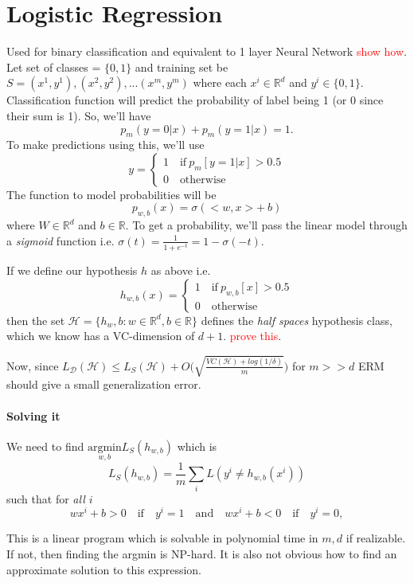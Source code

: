 \section{Logistic Regression}
Used for binary classification and equivalent to 1 layer Neural Network \textcolor{red}{show how}. Let set of classes = $\{0,1\}$ and training set be $S = {(x^1, y^1), (x^2, y^2), ... (x^m, y^m)}$ where each $x^i \in \mathbb{R}^d$ and $y^i \in \{0,1\}$. Classification function will predict the probability of label being 1 (or 0 since their sum is 1). So, we'll have
\[
	p_m(y=0|x) + p_m(y=1|x) = 1.
\]
To make predictions using this, we'll use
\[
y = 
\begin{cases} 
\text{1} \quad \text{if} ~p_m[y=1 | x] > 0.5\\
\text{0} \quad \text{otherwise}
\end{cases}
\]
The function to model probabilities will be 
\[
	p_{w,b}(x) = \sigma(<w,x> +~ b)
\]
where $W \in \mathbb{R}^d$ and $b \in \mathbb{R}$. To get a probability, we'll pass the linear model through a \textit{sigmoid} function i.e. $\sigma(t) = \frac{1}{1 + e^{-t}} = 1-\sigma(-t)$.

If we define our hypothesis $h$ as above i.e. 
\[
h_{w,b}(x) = 
\begin{cases} 
\text{1} \quad \text{if} ~p_{w,b}[x] > 0.5\\
\text{0} \quad \text{otherwise}
\end{cases}
\]
then the set $\mathcal{H} = \{h_w,b: w\in\mathbb{R}^d, b\in\mathbb{R}\}$ defines the \textit{half spaces} hypothesis class, which we know has a VC-dimension of $d+1$. \textcolor{red}{prove this}.

Now, since $L_\mathcal{D}(\mathcal{H}) \leq L_S(\mathcal{H}) + O\big(\sqrt{\frac{VC(\mathcal{H}) + log(1/\delta)}{m}}\big)$ for $m>>d$ ERM should give a small generalization error.

\paragraph{Solving it} We need to find $\underset{w,b}{\text{argmin}}L_S(h_{w,b})$ which is
\[
	L_S(h_{w,b}) = \frac{1}{m}\sum_{i}L(y^i \neq h_{w,b}(x^i))
\] 
such that for \textit{all $i$}
\[
	wx^i + b > 0 \quad \text{if} \quad y^i = 1 \quad \text{and} \quad
	wx^i + b < 0 \quad \text{if} \quad y^i = 0,	
\]

This is a linear program which is solvable in polynomial time in $m,d$ if realizable. If not, then finding the argmin is NP-hard. It is also not obvious how to find an approximate solution to this expression.

